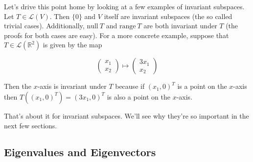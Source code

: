 \documentclass[12pt]{article}
\begin{document}
Let's drive this point home by looking at a few examples of invariant subspaces. Let $T \in \mathcal{L}(V)$. Then $\{0\}$ and $V$ itself are invariant subspaces (the so called trivial cases). Additionally, $\textrm{null} \: T$ and $\textrm{range} \: T$ are both invariant under $T$ (the proofs for both cases are easy). For a more concrete example, suppose that $T \in \mathcal{L} (\mathbb{R}^2)$ is given by the map

\[ \begin{pmatrix}
x_1 \\
x_2
\end{pmatrix}
%
\mapsto
\begin{pmatrix}
3x_1 \\
x_2
\end{pmatrix}
\]

Then the $x$-axis is invariant under $T$ because if $(x_1, 0)^T$ is a point on the $x$-axis then $T((x_1, 0)^T) = (3x_1, 0)^T$ is also a point on the $x$-axis.

That's about it for invariant subspaces. We'll see why they're so important in the next few sections.


\subsection*{Eigenvalues and Eigenvectors}
\end{document}
